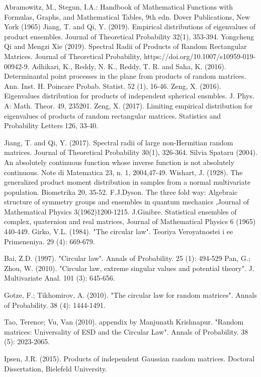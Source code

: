 \documentclass[12pt]{article}
\theoremstyle{plain}
\theoremstyle{definition}
\theoremstyle{remark}
\begin{document}



\begin{thebibliography}{n} %


  Abramowitz, M., Stegun, I.A.: Handbook of Mathematical Functions with Formulas, Graphs, and Mathematical Tables, 9th edn. Dover Publications, New York (1965)
 Jiang, T. and Qi, Y. (2019). Empirical distributions of eigenvalues of product ensembles. Journal of Theoretical Probability 32(1), 353-394.
 Yongcheng Qi and Mengzi Xie (2019). Spectral Radii of Products of Random Rectangular Matrices. Journal of Theoretical Probability, https://doi.org/10.1007/s10959-019-00942-9.
Adhikari, K., Reddy, N. K., Reddy, T. R. and Saha, K. (2016). Determinantal point processes in the plane from products of random matrices. Ann. Inst. H. Poincare Probab. Statist. 52 (1), 16-46.
Zeng, X. (2016). Eigenvalues distribution for products of independent spherical ensmbles. J. Phys. A: Math. Theor. 49, 235201.
Zeng, X. (2017). Limiting empirical distribution for eigenvalues of products of random rectangular matrices. Statistics and Probability Letters 126, 33-40.

Jiang, T. and Qi, Y. (2017). Spectral radii of large non-Hermitian random matrices. Journal of Theoretical Probability 30(1), 326-364.
Silvia Spataru (2004). An absolutely continuous function whose inverse function is not absolutely continuous. Note di Matematica 23, n. 1, 2004,47-49.
  Wishart, J. (1928). The generalized product moment distribution in samples from a normal multivariate population. Biometrika 20, 35-52.
F.J.Dyson. The three fold way: Algebraic structure of symmetry groups and ensembles in quantum mechanics ,Journal of Mathematical Physics 3(1962)1200-1215.
  J.Ginibre. Statistical ensembles of complex, quaternion and real matrices, Journal of Mathematical Physics 6 (1965) 440-449.
 Girko, V.L. (1984). "The circular law". Teoriya Veroyatnostei i ee Primeneniya. 29 (4): 669-679.

Bai, Z.D. (1997). "Circular law". Annals of Probability. 25 (1): 494-529
Pan, G.; Zhou, W. (2010). "Circular law, extreme singular values and potential theory". J. Multivariate Anal. 101 (3): 645-656.

Gotze, F.; Tikhomirov, A. (2010). "The circular law for random matrices". Annals of Probability. 38 (4): 1444-1491.

 Tao, Terence; Vu, Van (2010). appendix by Manjunath Krishnapur. "Random matrices: Universality of ESD and the Circular Law". Annals of Probability. 38 (5): 2023-2065.

 Ipsen, J.R. (2015). Products of independent Gaussian random matrices. Doctoral Dissertation, Bielefeld University.
\end{thebibliography}
\end{document}
